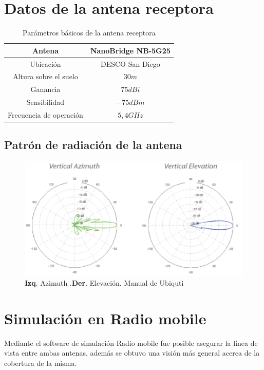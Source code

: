\documentclass[11pt, a4paper, twosides]{report}
\begin{document}
\section{Datos de la antena receptora}
\begin{table}[ht]
\centering
 \begin{tabular}{|c|c|}
	\hline \cellcolor{gray75} Antena  & \cellcolor{gray75} NanoBridge NB-5G25 \\ 
	\hline Ubicación & DESCO-San Diego  \\ 
	\hline Altura sobre el suelo & $30m$ \\ 
	\hline Ganancia & $75dBi$\\ 
	\hline Sensibilidad & $-75 dBm$\\
	\hline Frecuencia de operación & $5,4 GHz$\\
	\hline 
\end{tabular}
\caption{Parámetros básicos de la antena receptora}
\label{tab:AntD}
\end{table}

\subsection{Patrón de radiación de la antena}
\begin{figure}[h]
    \centering
    \includegraphics[width=1\linewidth]{antD.png}
    \caption{\textbf{Izq}. Azimuth .\textbf{Der}. Elevación. Manual de Ubiquti}
    \label{fig:antd}
\end{figure}

\section{Simulación en Radio mobile} 

Mediante el software de simulación Radio mobile fue posible asegurar la línea de vista entre ambas antenas, además se obtuvo una visión más general acerca de la cobertura de la misma. 
\end{document}

